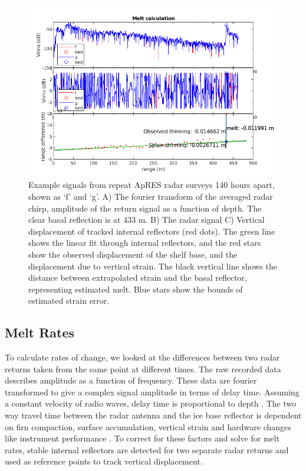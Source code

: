 \begin{figure}[!ht]
\centering
\includegraphics[width=1\textwidth]{chapters/3/melt_calc.png}
\caption[ApRES example]{Example signals from repeat ApRES radar surveys 140 hours apart, shown as `f' and `g'. A) The fourier transform of the averaged radar chirp, amplitude of the return signal as a function of depth. The clear basal reflection is at 433 m. B) The radar signal
C) Vertical displacement of tracked internal reflectors (red dots). The green line shows the linear fit through internal reflectors, and the red stars show the observed displacement of the shelf base, and the displacement due to vertical strain. The black vertical line shows the distance between extrapolated strain and the basal reflector, representing estimated melt. Blue stars show the bounds of estimated strain error. }
\label{fig:example_signal}
\end{figure}

\subsection{Melt Rates}

To calculate rates of change, we looked at the differences between two radar returns taken from the same point at different times.
The raw recorded data describes amplitude as a function of frequency. These data are fourier transformed to give a complex signal amplitude in terms of delay time. Assuming a constant velocity of radio waves, delay time is proportional to depth \citep{nicholls2015ground}. 
The two way travel time between the radar antenna and the ice base reflector is dependent on firn compaction, surface accumulation, vertical strain and hardware changes like instrument performance \citep{nicholls2015ground}. To correct for these factors and solve for melt rates, stable internal reflectors are detected for two separate radar returns and used as reference points to track vertical displacement. 

